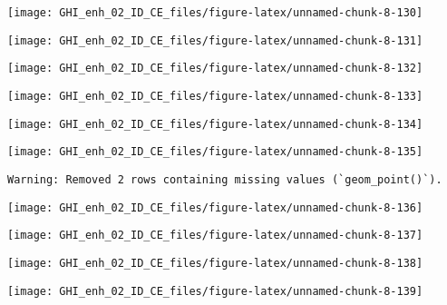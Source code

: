 \documentclass[
  10pt,
  a4paper,oneside]{article}
\begin{document}
\begin{center}\texttt{[image: GHI\_enh\_02\_ID\_CE\_files/figure-latex/unnamed-chunk-8-130]} \end{center}

\begin{center}\texttt{[image: GHI\_enh\_02\_ID\_CE\_files/figure-latex/unnamed-chunk-8-131]} \end{center}

\begin{center}\texttt{[image: GHI\_enh\_02\_ID\_CE\_files/figure-latex/unnamed-chunk-8-132]} \end{center}

\begin{center}\texttt{[image: GHI\_enh\_02\_ID\_CE\_files/figure-latex/unnamed-chunk-8-133]} \end{center}

\begin{center}\texttt{[image: GHI\_enh\_02\_ID\_CE\_files/figure-latex/unnamed-chunk-8-134]} \end{center}

\begin{center}\texttt{[image: GHI\_enh\_02\_ID\_CE\_files/figure-latex/unnamed-chunk-8-135]} \end{center}

\begin{verbatim}
Warning: Removed 2 rows containing missing values (`geom_point()`).
\end{verbatim}

\begin{center}\texttt{[image: GHI\_enh\_02\_ID\_CE\_files/figure-latex/unnamed-chunk-8-136]} \end{center}

\begin{center}\texttt{[image: GHI\_enh\_02\_ID\_CE\_files/figure-latex/unnamed-chunk-8-137]} \end{center}

\begin{center}\texttt{[image: GHI\_enh\_02\_ID\_CE\_files/figure-latex/unnamed-chunk-8-138]} \end{center}

\begin{center}\texttt{[image: GHI\_enh\_02\_ID\_CE\_files/figure-latex/unnamed-chunk-8-139]} \end{center}
\end{document}

